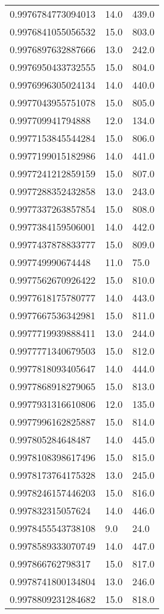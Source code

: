 \begin{center}
\begin{supertabular}[H]{p{0.30\textwidth}p{0.05\textwidth}p{0.05\textwidth}}
0.9976784773094013 & 14.0 & 439.0 \\ 
0.9976841055056532 & 15.0 & 803.0 \\ 
0.9976897632887666 & 13.0 & 242.0 \\ 
0.9976950433732555 & 15.0 & 804.0 \\ 
0.9976996305024134 & 14.0 & 440.0 \\ 
0.9977043955751078 & 15.0 & 805.0 \\ 
0.997709941794888 & 12.0 & 134.0 \\ 
0.9977153845544284 & 15.0 & 806.0 \\ 
0.9977199015182986 & 14.0 & 441.0 \\ 
0.9977241212859159 & 15.0 & 807.0 \\ 
0.9977288352432858 & 13.0 & 243.0 \\ 
0.9977337263857854 & 15.0 & 808.0 \\ 
0.9977384159506001 & 14.0 & 442.0 \\ 
0.9977437878833777 & 15.0 & 809.0 \\ 
0.997749990674448 & 11.0 & 75.0 \\ 
0.9977562670926422 & 15.0 & 810.0 \\ 
0.9977618175780777 & 14.0 & 443.0 \\ 
0.9977667536342981 & 15.0 & 811.0 \\ 
0.9977719939888411 & 13.0 & 244.0 \\ 
0.9977771340679503 & 15.0 & 812.0 \\ 
0.9977818093405647 & 14.0 & 444.0 \\ 
0.9977868918279065 & 15.0 & 813.0 \\ 
0.9977931316610806 & 12.0 & 135.0 \\ 
0.9977996162825887 & 15.0 & 814.0 \\ 
0.997805284648487 & 14.0 & 445.0 \\ 
0.9978108398617496 & 15.0 & 815.0 \\ 
0.9978173764175328 & 13.0 & 245.0 \\ 
0.9978246157446203 & 15.0 & 816.0 \\ 
0.997832315057624 & 14.0 & 446.0 \\ 
0.9978455543738108 & 9.0 & 24.0 \\ 
0.9978589333070749 & 14.0 & 447.0 \\ 
0.997866762798317 & 15.0 & 817.0 \\ 
0.9978741800134804 & 13.0 & 246.0 \\ 
0.9978809231284682 & 15.0 & 818.0 \\ 

\end{supertabular}
\end{center}

